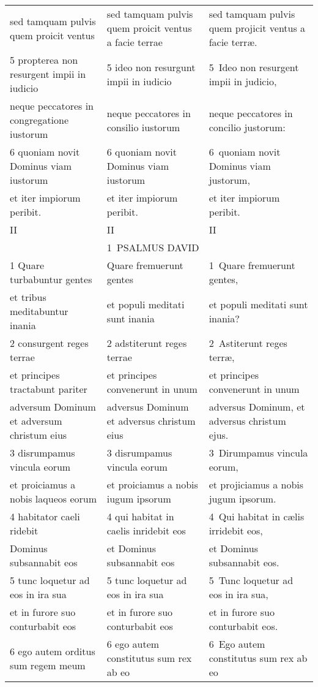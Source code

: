 \documentclass{article}
\begin{document}
\begin{longtable}{@{}p{}p{}p{}@{}}
sed tamquam pulvis quem proicit ventus	&	sed tamquam pulvis quem proicit ventus a facie terrae	&	sed tamquam pulvis quem projicit ventus a facie terræ.	\\
5 propterea non resurgent impii in iudicio	&	5 ideo non resurgunt impii in iudicio	&	5 Ideo non resurgent impii in judicio,	\\
neque peccatores in congregatione iustorum	&	neque peccatores in consilio iustorum	&	neque peccatores in concilio justorum:	\\
6 quoniam novit Dominus viam iustorum	&	6 quoniam novit Dominus viam iustorum	&	6 quoniam novit Dominus viam justorum,	\\
et iter impiorum peribit.	&	et iter impiorum peribit.	&	et iter impiorum peribit.	\\
II	&	II	&	II	\\
	&	1 PSALMUS DAVID	&		\\
1 Quare turbabuntur gentes	&	Quare fremuerunt gentes	&	1 Quare fremuerunt gentes,	\\
et tribus meditabuntur inania	&	et populi meditati sunt inania	&	et populi meditati sunt inania?	\\
2 consurgent reges terrae	&	2 adstiterunt reges terrae	&	2 Astiterunt reges terræ,	\\
et principes tractabunt pariter	&	et principes convenerunt in unum	&	et principes convenerunt in unum	\\
adversum Dominum et adversum christum eius	&	adversus Dominum et adversus christum eius	&	adversus Dominum, et adversus christum ejus.	\\
3 disrumpamus vincula eorum	&	3 disrumpamus vincula eorum	&	3 Dirumpamus vincula eorum,	\\
et proiciamus a nobis laqueos eorum	&	et proiciamus a nobis iugum ipsorum	&	et projiciamus a nobis jugum ipsorum.	\\
4 habitator caeli ridebit	&	4 qui habitat in caelis inridebit eos	&	4 Qui habitat in cælis irridebit eos,	\\
Dominus subsannabit eos	&	et Dominus subsannabit eos	&	et Dominus subsannabit eos.	\\
5 tunc loquetur ad eos in ira sua	&	5 tunc loquetur ad eos in ira sua	&	5 Tunc loquetur ad eos in ira sua,	\\
et in furore suo conturbabit eos	&	et in furore suo conturbabit eos	&	et in furore suo conturbabit eos.	\\
6 ego autem orditus sum regem meum	&	6 ego autem constitutus sum rex ab eo	&	6 Ego autem constitutus sum rex ab eo	\\

\end{longtable}
\end{document}
